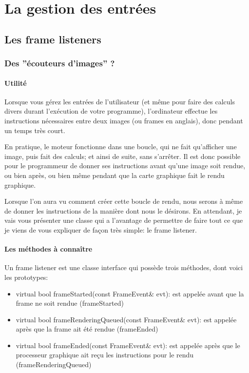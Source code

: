 

\chapter{La gestion des entrées}




\section{Les frame listeners}





\subsection{Des ''écouteurs d'images'' ?}
\subsubsection{Utilité}
Lorsque vous gérez les entrées de l'utilisateur (et même pour faire des calculs divers durant l'exécution de votre programme), l'ordinateur effectue les instructions nécessaires entre deux images (ou frames en anglais), donc pendant un temps très court.

En pratique, le moteur fonctionne dans une boucle, qui ne fait qu'afficher une image, puis fait des calculs; et ainsi de suite, sans s'arrêter. Il est donc possible pour le programmeur de donner ses instructions avant qu'une image soit rendue, ou bien après, ou bien même pendant que la carte graphique fait le rendu graphique.

Lorsque l'on aura vu comment créer cette boucle de rendu, nous serons à même de donner les instructions de la manière dont nous le désirons. En attendant, je vais vous présenter une classe qui a l'avantage de permettre de faire tout ce que je viens de vous expliquer de façon très simple: le frame listener.



\subsubsection{Les méthodes à connaître}
Un frame listener est une classe interface qui possède trois méthodes, dont voici les prototypes:

\begin{itemize}
\item virtual bool frameStarted(const FrameEvent\& evt): est appelée avant que la frame ne soit rendue (frameStarted)
\item virtual bool frameRenderingQueued(const FrameEvent\& evt): est appelée après que la frame ait été rendue (frameEnded)
\item virtual bool frameEnded(const FrameEvent\& evt): est appelée après que le processeur graphique ait reçu les instructions pour le rendu (frameRenderingQueued)\newline
\end{itemize}
    


